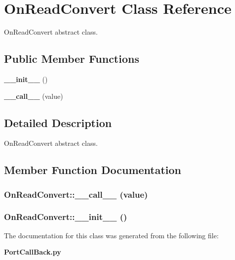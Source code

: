\section{On\-Read\-Convert Class Reference}
\label{classOnReadConvert}
On\-Read\-Convert abstract class.  


\subsection*{Public Member Functions}
\begin{CompactItemize}
\item 
{\bf \_\-\_\-init\_\-\_\-} ()
\item 
{\bf \_\-\_\-call\_\-\_\-} (value)
\end{CompactItemize}


\subsection{Detailed Description}
On\-Read\-Convert abstract class. 



\subsection{Member Function Documentation}
\subsubsection{\setlength{\rightskip}{0pt plus 5cm}On\-Read\-Convert::\_\-\_\-call\_\-\_\- (value)}\label{classOnReadConvert_OnReadConverta1}


\subsubsection{\setlength{\rightskip}{0pt plus 5cm}On\-Read\-Convert::\_\-\_\-init\_\-\_\- ()}\label{classOnReadConvert_OnReadConverta0}




The documentation for this class was generated from the following file:\begin{CompactItemize}
\item 
{\bf Port\-Call\-Back.py}\end{CompactItemize}
